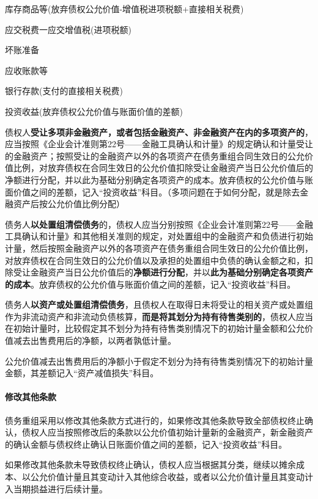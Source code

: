\documentclass[UTF8,12pt]{ctexart}
\newenvironment{Dr}{%
	\begin{list}{}%
		{
			\setlength{\leftmargin}{2em}
			\setlength{\labelwidth}{2em}
			\setlength{\labelsep}{0pt}
			\setlength{\itemindent}{0pt}
			\setlength{\listparindent}{0pt}
			\setlength{\parsep}{0pt}
			\setlength{\topsep}{0pt}
		}
		\item[\textbf{借：}]
	}{%
	\end{list}
}
\newenvironment{Cr}{%
	\begin{list}{}%
		{
			\setlength{\leftmargin}{3em}
			\setlength{\labelwidth}{2em}
			\setlength{\labelsep}{0pt}
			\setlength{\itemindent}{0pt}
			\setlength{\listparindent}{0pt}
			\setlength{\parsep}{0pt}
			\setlength{\topsep}{0pt}
		}
		\item[\textbf{贷：}]
	}{%
	\end{list}
}
\numberwithin{equation}{section} %
\numberwithin{figure}{section}
\numberwithin{table}{section}
\begin{document}
	\begin{Dr}
		库存商品等(放弃债权公允价值-增值税进项税额+直接相关税费)
		
		应交税费一应交增值税(进项税额)
		
		坏账准备
	\end{Dr}
	\begin{Cr}
		应收账款等
		
		银行存款(支付的直接相关税费)
		
		投资收益(放弃债权公允价值与账面价值的差额)
	\end{Cr}
	
	债权人\textbf{受让多项非金融资产，或者包括金融资产、非金融资产在内的多项资产的}，应当按照《企业会计准则第22号——金融工具确认和计量》的规定确认和计量受让的金融资产；按照受让的金融资产以外的各项资产在债务重组合同生效日的公允价值比例，对放弃债权在合同生效日的公允价值扣除受让金融资产当日公允价值后的净额进行分配，并以此为基础分别确定各项资产的成本。放弃债权的公允价值与账面价值之间的差额，记入“投资收益”科目。（多项问题在于如何分配，就是除去金融资产后按公允价值比例分配）
	
	债务人\textbf{以处置组清偿债务}的，债权人应当分别按照《企业会计准则第22号——金融工具确认和计量》和其他相关准则的规定，对处置组中的金融资产和负债进行初始计量，然后按照金融资产以外的各项资产在债务重组合同生效日的公允价值比例，对放弃债权在合同生效日的公允价值以及承担的处置组中负债的确认金额之和，扣除受让金融资产当日公允价值后的\textbf{净额进行分配}，并以\textbf{此为基础分别确定各项资产的成本}。放弃债权的公允价值与账面价值之间的差额，记入“投资收益”科目。
	
	债务人\textbf{以资产或处置组清偿债务}，且债权人在取得日未将受让的相关资产或处置组作为非流动资产和非流动负债核算，\textbf{而是将其划分为持有待售类别的}，债权人应当在初始计量时，比较假定其不划分为持有待售类别情况下的初始计量金额和公允价值减去出售费用后的净额，以两者孰低计量。
	
	公允价值减去出售费用后的净额小于假定不划分为持有待售类别情况下的初始计量金额，其差额记入“资产减值损失”科目。
	
	\paragraph{修改其他条款}
	债务重组采用以修改其他条款方式进行的，如果修改其他条款导致全部债权终止确认，债权人应当按照修改后的条款以公允价值初始计量新的金融资产，新金融资产的确认金额与债权终止确认日账面价值之间的差额，记入“投资收益”科目。
	
	如果修改其他条款未导致债权终止确认，债权人应当根据其分类，继续以摊余成本、以公允价值计量且其变动计入其他综合收益，或者以公允价值计量且其变动计入当期损益进行后续计量。
	
\end{document}
